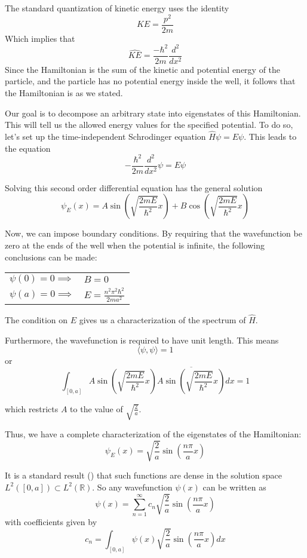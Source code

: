 The standard quantization of kinetic energy uses the identity
\[
    KE = \frac{p^2}{2m}
\]
Which implies that
\[
    \hat{KE} = \frac{-\hbar^2}{2m}\frac{d^2}{dx^2}
\]
Since the Hamiltonian is the sum of the kinetic and potential energy of the
particle, and the particle has no potential energy inside the well, it follows
that the Hamiltonian is as we stated.

Our goal is to decompose an arbitrary state into eigenstates of this
Hamiltonian. This will tell us the allowed energy values for the specified
potential. To do so, let's set up the time-independent Schrodinger equation
$\hat{H}\psi = E\psi$.
This leads to the equation
\[
    -\frac{\hbar^2}{2m}\frac{d^2}{dx^2}\psi = E \psi
\]

Solving this second order differential equation has the general solution
\[
    \psi_E(x) =
    A\sin\left(\sqrt{\frac{2mE}{\hbar^2}}x\right) + 
    B\cos\left(\sqrt{\frac{2mE}{\hbar^2}}x\right)
\]

Now, we can impose boundary conditions. By requiring that the wavefunction be
zero at the ends of the well when the potential is infinite, the following
conclusions can be made:
\begin{center}
\begin{tabular}{l l}
    $\psi(0) = 0 \implies$  & $B = 0$\\
    $\psi(a) = 0 \implies$  & $E = \frac{n^2\pi^2\hbar^2}{2ma^2}$
\end{tabular}
\end{center}

The condition on $E$ gives us a characterization of the spectrum of $\hat{H}$.

Furthermore, the wavefunction is required to have unit length. This means
\[\langle \psi, \psi \rangle = 1\]
or
\[\int_{[0,a]} A\sin\left(\sqrt{\frac{2mE}{\hbar^2}}x\right)
          \overline{A\sin\left(\sqrt{\frac{2mE}{\hbar^2}}x\right)}dx = 1\]

which restricts $A$ to the value of $\sqrt{\frac{2}{a}}$.

Thus, we have a complete characterization of the eigenstates of the Hamiltonian:
\[
    \psi_E(x) = \sqrt{\frac{2}{a}}\sin(\frac{n\pi}{a}x)
\]

It is a standard result (\cite[p. 89]{Folland2009})
that such functions are dense in the solution space
$L^2([0,a]) \subset L^2(\mathbb{R})$. So any wavefunction $\psi(x)$ can be written
as
\[
    \psi(x) =
    \sum_{n=1}^{\infty} c_n \sqrt{\frac{2}{a}}\sin(\frac{n\pi}{a}x)
\]
with coefficients given by
\[
    c_n = \int_{[0,a]} \psi(x)\sqrt{\frac{2}{a}}\sin(\frac{n\pi}{a}x)dx
\]

